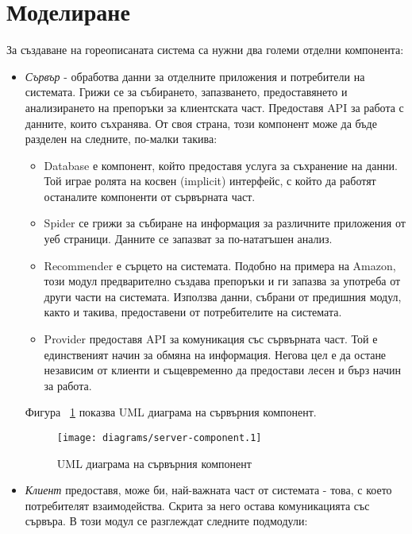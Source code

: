 \section{Моделиране}
	
	За създаване на гореописаната система са нужни два големи отделни компонента:
	
	\begin{itemize}
		\item \emph{Сървър} - обработва данни за отделните приложения и потребители на системата. Грижи се за събирането, запазването, предоставянето
		и анализирането на препоръки за клиентската част. Предоставя \ac{API} за работа с данните, които съхранява. От своя страна, този компонент
		може да бъде разделен на следните, по-малки такива:
		
		\begin{itemize}
			\item Database е компонент, който предоставя услуга за съхранение на данни. Той играе ролята на косвен (implicit) интерфейс, с който да работят останалите компоненти от сървърната част.
			\item Spider се грижи за събиране на информация за различните приложения от уеб страници. Данните се запазват за по-нататъшен анализ.
			\item Recommender е сърцето на системата. Подобно на примера на Amazon, този модул предварително създава препоръки и ги запазва за употреба
			от други части на системата. Използва данни, събрани от предишния модул, както и такива, предоставени от потребителите на системата.
			\item Provider предоставя \ac{API} за комуникация със сървърната част. Той е единственият начин за обмяна на информация. Негова цел е да остане независим от клиенти и същевременно да предостави лесен и бърз начин за работа.
		\end{itemize}
		
		Фигура ~\ref{figure:server-component} показва UML диаграма на сървърния компонент.
		
		\begin{figure}[htbp]
			\centering	
 			\texttt{[image: diagrams/server-component.1]}
			\caption{UML диаграма на сървърния компонент}
			\label{figure:server-component}
		\end{figure}
		
		
		\item \emph{Клиент} предоставя, може би, най-важната част от системата - това, с което потребителят взаимодейства. Скрита за него остава комуникацията със сървъра. В този модул се разглеждат следните подмодули:
		

\end{itemize}
